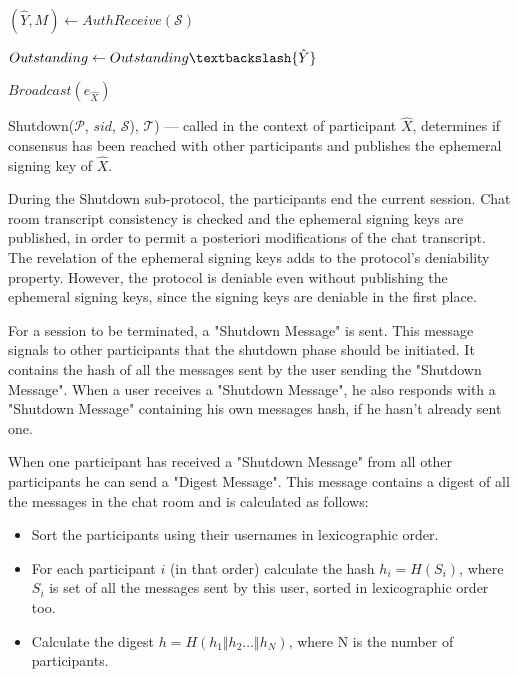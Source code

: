 \begin{algorithm}[p]
{    
    {
        $(\hat{Y}, M) \leftarrow AuthReceive(\mathcal{S})$
        
        {
          \Return{$\perp$}
        }
        \Else
        {
          $Outstanding \leftarrow Outstanding \textbackslash \{\hat{Y}\}$
        }                       
    }
    
    
    $Broadcast(e_{\hat{X}})$
    
  }
  \caption{Shutdown($\mathcal{P}$, $sid$, $\mathcal{S}$), $\mathcal{T}$) --- called in the context of participant $\hat{X}$, determines if consensus has been reached with other participants and publishes the ephemeral signing key of $\hat{X}$.}
  \label{algo:shutdown}
\end{algorithm}

During the Shutdown sub-protocol, the participants end the current session. Chat room transcript consistency is checked and the ephemeral signing keys are published, in order to permit a posteriori modifications of the chat transcript. The revelation of the ephemeral signing keys adds to the protocol's deniability property. However, the protocol is deniable even without publishing the ephemeral signing keys, since the signing keys are deniable in the first place.

For a session to be terminated, a "Shutdown Message" is sent. This message signals to other participants that the shutdown phase should be initiated. It contains the  hash of all the messages sent by the user sending the "Shutdown Message". When a user receives a "Shutdown Message", he also responds with a "Shutdown Message" containing his own messages hash, if he hasn't already sent one.

When one participant has received a "Shutdown Message" from all other participants he can send a "Digest Message". This message contains a digest of all the messages in the chat room and is calculated as follows:
\begin{itemize}
  \item[] Sort the participants using their usernames in lexicographic order.
  \item[] For each participant $i$ (in that order) calculate the hash $h_i = H(S_i)$, where $S_i$ is set of all the messages sent by this user, sorted in lexicographic order too.
  \item[] Calculate the digest $h = H(h_1 \Vert h_2 \dots \Vert h_N)$, where N is the number of participants.
\end{itemize}

